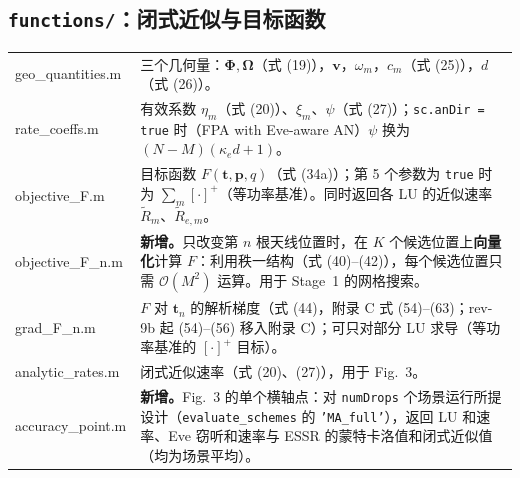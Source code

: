 \documentclass[11pt,a4paper]{ctexart}
\newcommand{\code}[1]{\texttt{#1}}
\newcommand{\bt}{\mathbf t}
\begin{document}
\subsection{\code{functions/}：闭式近似与目标函数}
\begin{longtable}{>{\ttfamily\small}p{4.6cm}p{11.2cm}}
\toprule
geo\_quantities.m & 三个几何量：$\boldsymbol\Phi,\boldsymbol\Omega$（式 (19)），$\mathbf v$，$\omega_m$，$c_m$（式 (25)），$d$（式 (26)）。\\
rate\_coeffs.m & 有效系数 $\eta_m$（式 (20)）、$\xi_m$、$\psi$（式 (27)）；\code{sc.anDir = true} 时（FPA with Eve-aware AN）$\psi$ 换为 $(N-M)(\kappa_e d+1)$。\\
objective\_F.m & 目标函数 $F(\bt,\mathbf p,q)$（式 (34a)）；第 5 个参数为 \code{true} 时为 $\sum_m[\cdot]^+$（等功率基准）。同时返回各 LU 的近似速率 $\tilde R_m$、$\tilde R_{e,m}$。\\
objective\_F\_n.m & \textbf{新增。}只改变第 $n$ 根天线位置时，在 $K$ 个候选位置上\textbf{向量化}计算 $F$：利用秩一结构（式 (40)--(42)），每个候选位置只需 $\mathcal O(M^2)$ 运算。用于 Stage~1 的网格搜索。\\
grad\_F\_n.m & $F$ 对 $\bt_n$ 的解析梯度（式 (44)，附录 C 式 (54)--(63)；rev-9b 起 (54)--(56) 移入附录 C）；可只对部分 LU 求导（等功率基准的 $[\cdot]^+$ 目标）。\\
analytic\_rates.m & 闭式近似速率（式 (20)、(27)），用于 Fig.~3。\\
accuracy\_point.m & \textbf{新增。}Fig.~3 的单个横轴点：对 \code{numDrops} 个场景运行所提设计（\code{evaluate\_schemes} 的 \code{'MA\_full'}），返回 LU 和速率、Eve 窃听和速率与 ESSR 的蒙特卡洛值和闭式近似值（均为场景平均）。\\
\bottomrule
\end{longtable}
\end{document}

